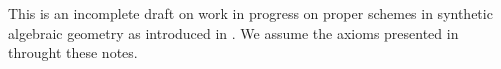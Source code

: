 
This is an incomplete draft on work in progress on proper schemes in synthetic algebraic geometry as introduced in \cite{draft}.
We assume the axioms presented in \cite{draft} throught these notes.